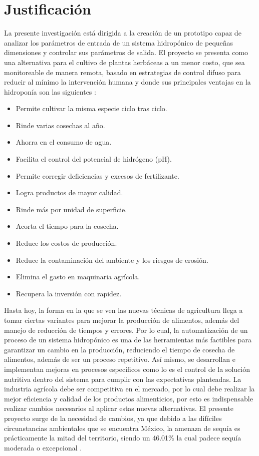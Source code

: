 \section{Justificación} \label{chap:justificacion}
La presente investigación está dirigida a la creación de un prototipo capaz de analizar los parámetros de entrada de un sistema hidropónico de pequeñas dimensiones y controlar sus parámetros de salida. El proyecto se presenta como una alternativa para el cultivo de plantas herbáceas a un menor costo, que sea monitoreable de manera remota, basado en estrategias de control difuso para reducir al mínimo la intervención humana y donde sus principales ventajas en la hidroponía son las siguientes \cite{aquino2015manual}:
\begin{itemize}
\item Permite cultivar la misma especie ciclo tras ciclo.
\item Rinde varias cosechas al año.
\item Ahorra en el consumo de agua.
\item Facilita el control del potencial de hidrógeno (pH).
\item Permite corregir deficiencias y excesos de fertilizante.
\item Logra productos de mayor calidad.
\item Rinde más por unidad de superficie.
\item Acorta el tiempo para la cosecha.
\item Reduce los costos de producción.
\item Reduce la contaminación del ambiente y los riesgos de erosión.
\item Elimina el gasto en maquinaria agrícola.
\item Recupera la inversión con rapidez.
\end{itemize}

Hasta hoy, la forma en la que se ven las nuevas técnicas de agricultura llega a tomar ciertas variantes para mejorar la producción de alimentos, además del manejo de reducción de tiempos y errores. Por lo cual, la automatización de un proceso de un sistema hidropónico es una de las herramientas más factibles para garantizar un cambio en la producción, reduciendo el tiempo de cosecha de alimentos, además de ser un proceso repetitivo. Así mismo, se desarrollan e implementan mejoras en procesos específicos como lo es el control de la solución nutritiva dentro del sistema para cumplir con las expectativas planteadas. La industria agrícola debe ser competitiva en el mercado, por lo cual debe realizar la mejor eficiencia y calidad de los productos alimenticios, por esto es indispensable realizar cambios necesarios al aplicar estas nuevas alternativas. El presente proyecto surge de la necesidad de cambios, ya que debido a las difíciles circunstancias ambientales que se encuentra México, la amenaza de sequía es prácticamente la mitad del territorio, siendo un 46.01\% la cual padece sequía moderada o excepcional \cite{Sequia}.


